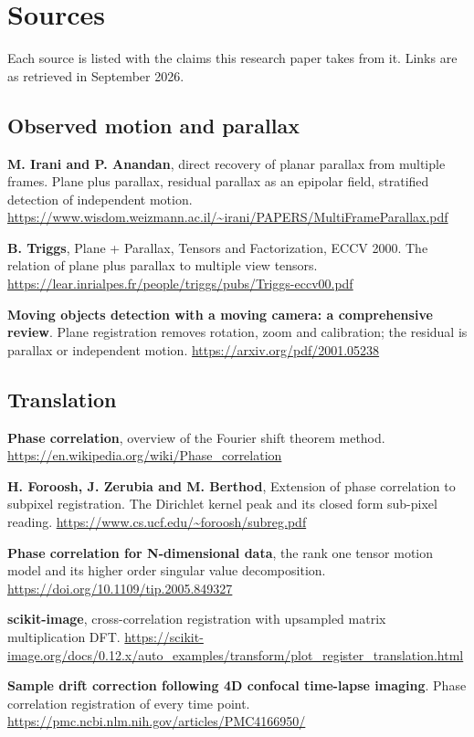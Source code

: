 \chapter{Sources}

Each source is listed with the claims this research paper takes from it. Links are as retrieved in September
2026.

\section*{Observed motion and parallax}

\textbf{M. Irani and P. Anandan}, direct recovery of planar parallax from multiple frames. Plane plus
parallax, residual parallax as an epipolar field, stratified detection of independent motion.
\url{https://www.wisdom.weizmann.ac.il/~irani/PAPERS/MultiFrameParallax.pdf}

\textbf{B. Triggs}, Plane + Parallax, Tensors and Factorization, ECCV 2000. The relation of plane plus
parallax to multiple view tensors.
\url{https://lear.inrialpes.fr/people/triggs/pubs/Triggs-eccv00.pdf}

\textbf{Moving objects detection with a moving camera: a comprehensive review}. Plane registration
removes rotation, zoom and calibration; the residual is parallax or independent motion.
\url{https://arxiv.org/pdf/2001.05238}

\section*{Translation}

\textbf{Phase correlation}, overview of the Fourier shift theorem method.
\url{https://en.wikipedia.org/wiki/Phase_correlation}

\textbf{H. Foroosh, J. Zerubia and M. Berthod}, Extension of phase correlation to subpixel
registration. The Dirichlet kernel peak and its closed form sub-pixel reading.
\url{https://www.cs.ucf.edu/~foroosh/subreg.pdf}

\textbf{Phase correlation for N-dimensional data}, the rank one tensor motion model and its higher
order singular value decomposition. \url{https://doi.org/10.1109/tip.2005.849327}

\textbf{scikit-image}, cross-correlation registration with upsampled matrix multiplication DFT.
\url{https://scikit-image.org/docs/0.12.x/auto_examples/transform/plot_register_translation.html}

\textbf{Sample drift correction following 4D confocal time-lapse imaging}. Phase correlation
registration of every time point.
\url{https://pmc.ncbi.nlm.nih.gov/articles/PMC4166950/}

